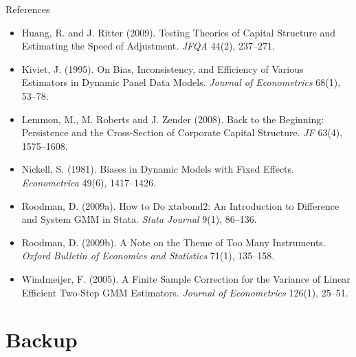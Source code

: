 \documentclass[
  11pt,
  ignorenonframetext,
  aspectratio=169,
]{beamer}
\begin{document}
\begin{frame}{References}
\begin{itemize}
  1371--1395.
\item
  Huang, R. and J. Ritter (2009). Testing Theories of Capital Structure
  and Estimating the Speed of Adjustment. \emph{JFQA} 44(2), 237--271.
\item
  Kiviet, J. (1995). On Bias, Inconsistency, and Efficiency of Various
  Estimators in Dynamic Panel Data Models. \emph{Journal of
  Econometrics} 68(1), 53--78.
\item
  Lemmon, M., M. Roberts and J. Zender (2008). Back to the Beginning:
  Persistence and the Cross-Section of Corporate Capital Structure.
  \emph{JF} 63(4), 1575--1608.
\item
  Nickell, S. (1981). Biases in Dynamic Models with Fixed Effects.
  \emph{Econometrica} 49(6), 1417--1426.
\item
  Roodman, D. (2009a). How to Do xtabond2: An Introduction to Difference
  and System GMM in Stata. \emph{Stata Journal} 9(1), 86--136.
\item
  Roodman, D. (2009b). A Note on the Theme of Too Many Instruments.
  \emph{Oxford Bulletin of Economics and Statistics} 71(1), 135--158.
\item
  Windmeijer, F. (2005). A Finite Sample Correction for the Variance of
  Linear Efficient Two-Step GMM Estimators. \emph{Journal of
  Econometrics} 126(1), 25--51.
\end{itemize}
\end{frame}

\section{Backup}\label{backup}
\end{document}
